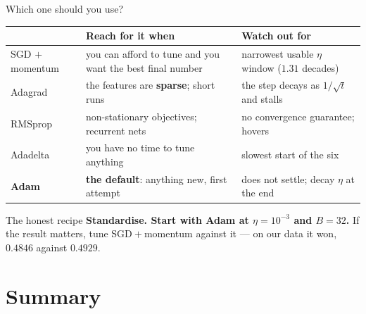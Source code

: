 \documentclass[aspectratio=169]{beamer}
\begin{document}
\begin{frame}[shrink=7]{Which one should you use?}
  \begin{center}\small
  \begin{tabular}{@{}lp{4.2cm}p{4.6cm}@{}}
    \toprule
    & \textbf{Reach for it when} & \textbf{Watch out for}\\
    \midrule
    SGD $+$ momentum & you can afford to tune and you want the best final
      number & narrowest usable $\eta$ window ($1.31$ decades)\\[3pt]
    Adagrad & the features are \textbf{sparse}; short runs & the step decays as
      $1/\sqrt{t}$ and stalls\\[3pt]
    RMSprop & non-stationary objectives; recurrent nets & no convergence
      guarantee; hovers\\[3pt]
    Adadelta & you have no time to tune anything & slowest start of the six\\[3pt]
    \textbf{Adam} & \textbf{the default}: anything new, first attempt & does not
      settle; decay $\eta$ at the end\\
    \bottomrule
  \end{tabular}
  \end{center}
  \vspace{0.3em}
  \begin{exampleblock}{The honest recipe}
    \small \textbf{Standardise. Start with Adam at $\eta = 10^{-3}$ and
    $B = 32$.} If the result matters, tune SGD${}+{}$momentum against it --- on
    our data it won, $0.4846$ against $0.4929$.
  \end{exampleblock}
\end{frame}

\section{Summary}
\label{sec:summary}
\end{document}
